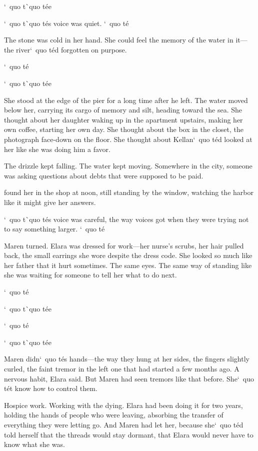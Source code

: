 \documentclass[12pt,letterpaper,openany]{book}
\begin{document}
\par
`\ quo t\`\ quo t\'e{}e{}
\par
`\ quo t\`\ quo t\'e{}s voice was quiet. `\ quo t\'e{}
\par
The stone was cold in her hand. She could feel the memory of the water in it—the river`\ quo t\'e{}d forgotten on purpose.
\par
`\ quo t\'e{}
\par
`\ quo t\`\ quo t\'e{}e{}
\par
She stood at the edge of the pier for a long time after he left. The water moved below her, carrying its cargo of memory and silt, heading toward the sea. She thought about her daughter waking up in the apartment upstairs, making her own coffee, starting her own day. She thought about the box in the closet, the photograph face-down on the floor. She thought about Kellan`\ quo t\'e{}d looked at her like she was doing him a favor.
\par
The drizzle kept falling. The water kept moving. Somewhere in the city, someone was asking questions about debts that were supposed to be paid.
\par
\hrulefillElara found her in the shop at noon, still standing by the window, watching the harbor like it might give her answers.
\par
`\ quo t\`\ quo t\'e{}s voice was careful, the way voices got when they were trying not to say something larger. `\ quo t\'e{}
\par
Maren turned. Elara was dressed for work—her nurse's scrubs, her hair pulled back, the small earrings she wore despite the dress code. She looked so much like her father that it hurt sometimes. The same eyes. The same way of standing like she was waiting for someone to tell her what to do next.
\par
`\ quo t\'e{}
\par
`\ quo t\`\ quo t\'e{}e{}
\par
`\ quo t\'e{}
\par
`\ quo t\`\ quo t\'e{}e{}
\par
Maren didn`\ quo t\'e{}s hands—the way they hung at her sides, the fingers slightly curled, the faint tremor in the left one that had started a few months ago. A nervous habit, Elara said. But Maren had seen tremors like that before. She`\ quo t\'e{}t know how to control them.
\par
Hospice work. Working with the dying. Elara had been doing it for two years, holding the hands of people who were leaving, absorbing the transfer of everything they were letting go. And Maren had let her, because she`\ quo t\'e{}d told herself that the threads would stay dormant, that Elara would never have to know what she was.
\end{document}
